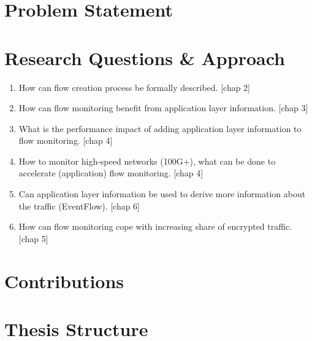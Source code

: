 \section{Problem Statement}


\section{Research Questions \& Approach} %

\begin{enumerate}
	\item How can flow creation process be formally described. [chap 2]
	\item How can flow monitoring benefit from application layer information. [chap 3]
	\item What is the performance impact of adding application layer information to flow monitoring. [chap 4]
	\item How to monitor high-speed networks (100G+), what can be done to accelerate (application) flow monitoring. [chap 4]
	\item Can application layer information be used to derive more information about the traffic (EventFlow). [chap 6]
	\item How can flow monitoring cope with increasing share of encrypted traffic. [chap 5]
\end{enumerate}


\section{Contributions}

% 
% 

\section{Thesis Structure}
